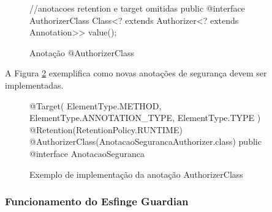 \begin{figure}[H]
    \centering
    \caption{Anotação @AuthorizerClass}
    \begin{java}
//anotacoes retention e target omitidas
public @interface AuthorizerClass {
	Class<? extends Authorizer<? extends Annotation>> value();
}

    \end{java}
    \label{fig:anotacao-authorizer-class}
\end{figure}

\par A Figura \ref{fig:anotacao-seguranca} exemplifica como novas anotações de segurança devem ser implementadas.

\begin{figure}[H]
    \centering
    \caption{Exemplo de implementação da anotação AuthorizerClass}
    \begin{java}
@Target({ ElementType.METHOD, ElementType.ANNOTATION_TYPE, ElementType.TYPE })
@Retention(RetentionPolicy.RUNTIME)
@AuthorizerClass(AnotacaoSegurancaAuthorizer.class) 
public @interface AnotacaoSeguranca { 
}
    \end{java}
    \label{fig:anotacao-seguranca}
\end{figure}

\subsubsection{Funcionamento do Esfinge Guardian}

